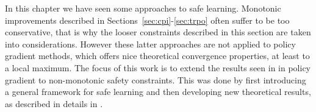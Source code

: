In this chapter we have seen some approaches to safe learning. Monotonic improvements described in Sections~\ref{sec:cpi}-\ref{sec:trpo} often suffer to be too conservative, that is why the looser constraints described in this section are taken into considerations. However these latter approaches are not applied to policy gradient methods, which offers nice theoretical convergence properties, at least to a local maximum. The focus of this work is to extend the results seen in  in policy gradient to non-monotonic safety constraints. This was done by first introducing a general framework for safe learning and then developing new theoretical results, as described in details in .

